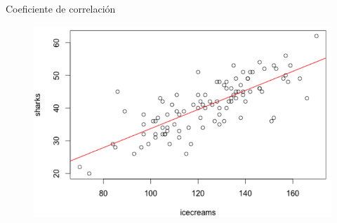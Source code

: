 \begin{frame}{Coeficiente de correlación}
	\begin{figure}
		\centering
		\includegraphics[scale=.36]{figuras/cau_y_corr_2.png}
	\end{figure}
\end{frame}